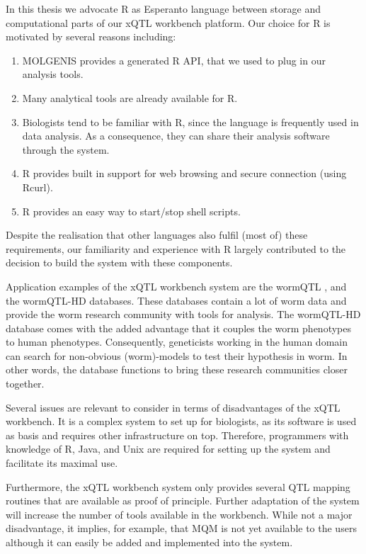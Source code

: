 In this thesis we advocate R \cite{R:2005} as Esperanto language between storage and computational parts of our xQTL workbench platform. Our choice for 
R is motivated by several reasons including: 

\begin{enumerate}\itemsep1pt
\item MOLGENIS provides a generated R API, that we used to plug in our analysis tools.
\item Many analytical tools are already available for R.
\item Biologists tend to be familiar with R, since the language is frequently used in data analysis. As a consequence, they can share their analysis software through the system.
\item R provides built in support for web browsing and secure connection (using Rcurl).
\item R provides an easy way to start/stop shell scripts.
\end{enumerate}

Despite the realisation that other languages also fulfil (most of) these requirements, our familiarity and experience with R largely 
contributed to the decision to build the system with these components.

Application examples of the xQTL workbench system are the wormQTL \cite{Snoek:2012}, and the wormQTL-HD \cite{vanDerVelde:2014} databases. These databases 
contain a lot of worm data and provide the worm research community with tools for analysis. The wormQTL-HD database comes with the added advantage that 
it couples the worm phenotypes to human phenotypes. Consequently, geneticists working in the human domain can search for non-obvious (worm)-models to test 
their hypothesis in worm. In other words, the database functions to bring these research communities closer together.

Several issues are relevant to consider in terms of disadvantages of the xQTL workbench. It is a complex system to set up for biologists, as its software 
is used as basis and requires other infrastructure on top. Therefore, programmers with knowledge of R, Java, and Unix are required for setting up the 
system and facilitate its maximal use.

Furthermore, the xQTL workbench system only provides several QTL mapping routines that are available as proof of principle. Further adaptation of the 
system will increase the number of tools available in the workbench. While not a major disadvantage, it implies, for example, that MQM is not yet 
available to the users although it can easily be added and implemented into the system.

